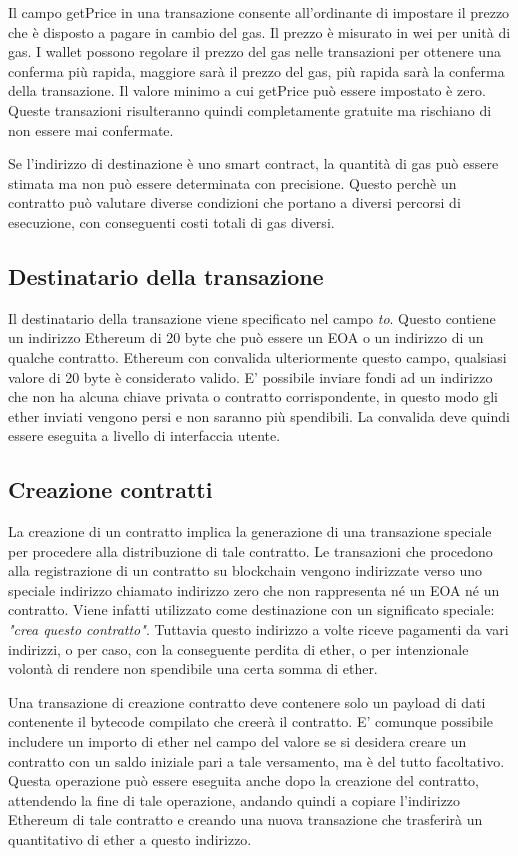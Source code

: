 Il campo getPrice in una transazione consente all'ordinante di impostare il prezzo che è disposto a pagare in cambio del gas. Il prezzo è misurato in wei per unità di gas. I wallet possono regolare il prezzo del gas nelle transazioni per ottenere una conferma più rapida, maggiore sarà il prezzo del gas, più rapida sarà la conferma della transazione. Il valore minimo a cui getPrice può essere impostato è zero. Queste transazioni risulteranno quindi completamente gratuite ma rischiano di non essere mai confermate. 

Se l'indirizzo di destinazione è uno smart contract, la quantità di gas può essere stimata ma non può essere determinata con precisione. Questo perchè un contratto può valutare diverse condizioni che portano a diversi percorsi di esecuzione, con conseguenti costi totali di gas diversi. 

\subsection*{Destinatario della transazione}
Il destinatario della transazione viene specificato nel campo \textit{to}. Questo contiene un indirizzo Ethereum di 20 byte che può essere un EOA o un indirizzo di un qualche contratto. Ethereum con convalida ulteriormente questo campo, qualsiasi valore di 20 byte è considerato valido. E' possibile inviare fondi ad un indirizzo che non ha alcuna chiave privata o contratto corrispondente, in questo modo gli ether inviati vengono persi e non saranno più spendibili. La convalida deve quindi essere eseguita a livello di interfaccia utente.

\subsection{Creazione contratti}
La creazione di un contratto implica la generazione di una transazione speciale per procedere alla distribuzione di tale contratto. Le transazioni che procedono alla registrazione di un contratto su blockchain vengono indirizzate verso uno speciale indirizzo chiamato indirizzo zero che non rappresenta né un EOA né un contratto. Viene infatti utilizzato come destinazione con un significato speciale: \textit{"crea questo contratto"}. Tuttavia questo indirizzo a volte riceve pagamenti da vari indirizzi, o per caso, con la conseguente perdita di ether, o per intenzionale volontà di rendere non spendibile una certa somma di ether.

Una transazione di creazione contratto deve contenere solo un payload di dati contenente il bytecode compilato che creerà il contratto. E' comunque possibile includere un importo di ether nel campo del valore se si desidera creare un contratto con un saldo iniziale pari a tale versamento, ma è del tutto facoltativo. Questa operazione può essere eseguita anche dopo la creazione del contratto, attendendo la fine di tale operazione, andando quindi a copiare l'indirizzo Ethereum di tale contratto e creando una nuova transazione che trasferirà un quantitativo di ether a questo indirizzo.

